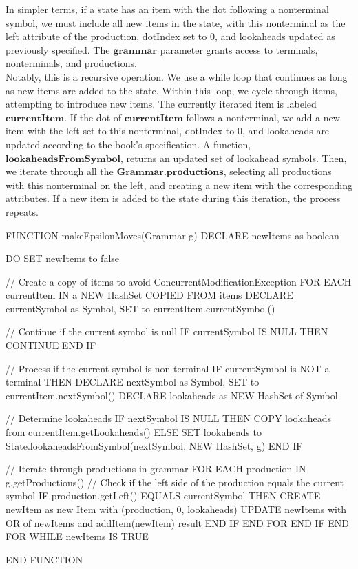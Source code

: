 In simpler terms, if a state has an item with the dot following a nonterminal symbol, we must include all new items in the state, with this nonterminal as the left attribute of the production, dotIndex set to 0, and lookaheads updated as previously specified. The \(\boldsymbol{grammar}\) parameter grants access to terminals, nonterminals, and productions.\\

Notably, this is a recursive operation. We use a while loop that continues as long as new items are added to the state. Within this loop, we cycle through items, attempting to introduce new items. The currently iterated item is labeled  \(\boldsymbol{currentItem}\). If the dot of \(\boldsymbol{currentItem}\) follows a nonterminal, we add a new item with the left set to this nonterminal, dotIndex to 0, and lookaheads are updated according to the book's specification. A function, \(\boldsymbol{lookaheadsFromSymbol}\), returns an updated set of lookahead symbols. Then, we iterate through all the \(\boldsymbol{Grammar.productions}\), selecting all productions with this nonterminal on the left, and creating a new item with the corresponding attributes. If a new item is added to the state during this iteration, the process repeats.\\

\begin{codeblock}
    FUNCTION makeEpsilonMoves(Grammar g)
    DECLARE newItems as boolean

    DO
    SET newItems to false

    // Create a copy of items to avoid ConcurrentModificationException
    FOR EACH currentItem IN a NEW HashSet COPIED FROM items
    DECLARE currentSymbol as Symbol, SET to currentItem.currentSymbol()

    // Continue if the current symbol is null
    IF currentSymbol IS NULL THEN
    CONTINUE
    END IF

    // Process if the current symbol is non-terminal
    IF currentSymbol is NOT a terminal THEN
    DECLARE nextSymbol as Symbol, SET to currentItem.nextSymbol()
    DECLARE lookaheads as NEW HashSet of Symbol

    // Determine lookaheads
    IF nextSymbol IS NULL THEN
    COPY lookaheads from currentItem.getLookaheads()
    ELSE
    SET lookaheads to State.lookaheadsFromSymbol(nextSymbol, NEW HashSet, g)
    END IF

    // Iterate through productions in grammar
    FOR EACH production IN g.getProductions()
    // Check if the left side of the production equals the current symbol
    IF production.getLeft() EQUALS currentSymbol THEN
    CREATE newItem as new Item with (production, 0, lookaheads)
    UPDATE newItems with OR of newItems and addItem(newItem) result
    END IF
    END FOR
    END IF
    END FOR
    WHILE newItems IS TRUE

    END FUNCTION
\end{codeblock}

